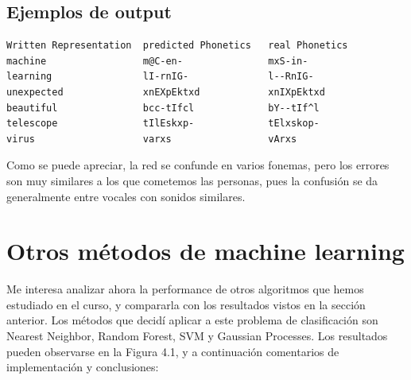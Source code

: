 \documentclass[paper=a4, fontsize=11pt]{scrartcl} %
\numberwithin{equation}{section} %
\numberwithin{figure}{section} %
\numberwithin{table}{section} %
\begin{document}
\subsection{Ejemplos de output}

\begin{center}
\begin{BVerbatim}
Written Representation  predicted Phonetics   real Phonetics  
machine                 m@C-en-               mxS-in-  
learning                lI-rnIG-              l--RnIG- 
unexpected              xnEXpEktxd            xnIXpEktxd  
beautiful               bcc-tIfcl             bY--tIf^l 
telescope               tIlEskxp-             tElxskop- 
virus                   varxs                 vArxs

\end{BVerbatim}
\end{center}


Como se puede apreciar, la red se confunde en varios fonemas, pero los errores son muy similares a los que cometemos las personas, pues la confusión se da generalmente entre vocales con sonidos similares. \\

\section{ Otros métodos de machine learning }


Me interesa analizar ahora la performance de otros algoritmos que hemos estudiado en el curso, y compararla con los resultados vistos en la sección anterior. Los métodos que decidí aplicar a este problema de clasificación son Nearest Neighbor, Random Forest, SVM y Gaussian Processes. Los resultados pueden observarse en la Figura 4.1, y a continuación comentarios de implementación y conclusiones:
\end{document}
